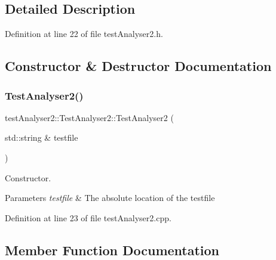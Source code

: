 \subsection{Detailed Description}


Definition at line 22 of file test\+Analyser2.\+h.



\subsection{Constructor \& Destructor Documentation}
\mbox{\label{classtestAnalyser2_1_1TestAnalyser2_ab5574c95c9f440a8b640afc30956184f}} 
\subsubsection{\texorpdfstring{TestAnalyser2()}{TestAnalyser2()}}
{\footnotesize\ttfamily test\+Analyser2\+::\+Test\+Analyser2\+::\+Test\+Analyser2 (\begin{DoxyParamCaption}\item[{std\+::string \&}]{testfile }\end{DoxyParamCaption})\hspace{0.3cm}{\ttfamily [explicit]}}



Constructor. 


\begin{DoxyParams}{Parameters}
{\em testfile} & The absolute location of the testfile \\
\hline
\end{DoxyParams}


Definition at line 23 of file test\+Analyser2.\+cpp.



\subsection{Member Function Documentation}
\mbox{\label{classtestAnalyser2_1_1TestAnalyser2_ab90ac14da653b04877d4f07698faf372}} 

